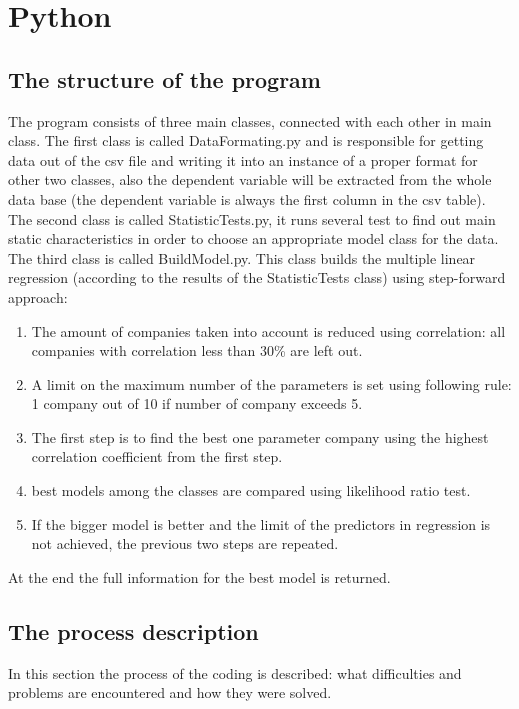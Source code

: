 \documentclass{article}
\begin{document}
\newpage
\section{Python}
\subsection{The structure of the program}
The program consists of three main classes, connected with each other in main class. The first class is called DataFormating.py and is responsible for getting data out of the csv file and writing it into an instance of a proper format for other two classes, also the dependent variable will be extracted from the whole data base (the dependent variable is always the first column in the csv table).\\
The second class is called StatisticTests.py, it runs several test to find out main static characteristics in order to choose an appropriate model class for the data.\\
The third class is called BuildModel.py. This class builds the multiple linear regression (according to the results of the StatisticTests class) using step-forward approach:
\begin{enumerate}
    \item The amount of companies taken into account is reduced using correlation: all companies with correlation less than 30\% are left out.
    \item A limit on the maximum number of the parameters is set using following rule: 1 company out of 10 if number of company exceeds 5.
    \item The first step is to find the best one parameter company using the highest correlation coefficient from the first step.
    \item best models among the classes are compared using likelihood ratio test. 
    \item If the bigger model is better and the limit of the predictors in regression is not achieved, the previous two steps are repeated.
\end{enumerate} 
At the end the full information for the best model is returned.

\subsection{The process description}
In this section the process of the coding is described: what difficulties and problems are encountered and how they were solved.
\end{document}
